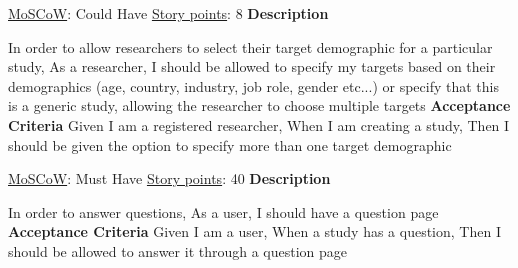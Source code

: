\documentclass[12pt, a4paper]{report}
\begin{document}
\vspace*{20px}

\begin{tcolorbox}[width=\textwidth,colback={White},title={\textbf {Updating Study Target Demographics UI}},colbacktitle=grey,coltitle=black]
\underline{MoSCoW}: Could Have
\hfill
\underline {Story points}: 8
\newline
\newline
\blindtext \textbf{Description}
\newline

In order to allow researchers to select their target demographic for a particular study,\newline
As a researcher,\newline
I should be allowed to specify my targets based on their demographics (age, country, industry, job role, gender etc...) or specify that this is a generic study, allowing the researcher to choose multiple targets
\newline
\newline
 \textbf{Acceptance Criteria}
 \newline
Given I am a registered researcher,\newline
When I am creating a study,\newline
Then I should be given the option to specify more than one target demographic 
\end{tcolorbox}  

\vspace*{20px}

\begin{tcolorbox}[width=\textwidth,colback={White},title={\textbf {Study page}},colbacktitle=grey,coltitle=black]
\underline{MoSCoW}: Must Have
\hfill
\underline {Story points}: 40
\newline
\newline
\blindtext \textbf{Description}
\newline

In order to answer questions,\newline
As a user,\newline
I should have a question page
\newline
\newline
 \textbf{Acceptance Criteria}
 \newline
Given I am a user,\newline
When a study has a question,\newline
Then I should be allowed to answer it through a question page
\end{tcolorbox}  
\end{document}
